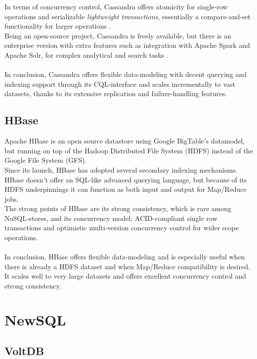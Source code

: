\documentclass{article}
\begin{document}
In terms of concurrency control, Cassandra offers atomicity for single-row operations and serializable \textit{lightweight transactions}, essentially a compare-and-set functionality for larger operations \cite{cassandra_lightweight_trans}.\\
Being an open-source project, Cassandra is freely available, but there is an enterprise version with extra features such as integration with Apache Spark and Apache Solr, for complex analytical and search tasks \cite{cassandra_solr} \cite{cassandra_spark}.\\\\
In conclusion, Cassandra offers flexible data-modeling with decent querying and indexing support through its CQL-interface and scales incrementally to vast datasets, thanks to its extensive replication and failure-handling features.

\subsection{HBase}

Apache HBase is an open source datastore using Google BigTable's datamodel, but running on top of the Hadoop Distributed File System (HDFS) instead of the Google File System (GFS).
\\Since its launch, HBase has adopted several secondary indexing mechanisms. HBase doesn't offer an SQL-like advanced querying language, but because of its HDFS underpinnings it can function as both input and output for Map/Reduce jobs.
\\The strong points of HBase are its strong consistency, which is rare among NoSQL-stores, and its concurrency model: ACID-compliant single row transactions and optimistic multi-version concurrency control for wider scope operations\cite{hbase_acid}\cite{grolinger2013data}\cite{borthakur2011apache}.\\\\
In conclusion, HBase offers flexible data-modeling and is especially useful when there is already a HDFS dataset and when Map/Reduce compatibility is desired. It scales well to very large datasets and offers excellent concurrency control and strong consistency.

\section{NewSQL}
\subsection{VoltDB}
\end{document}
